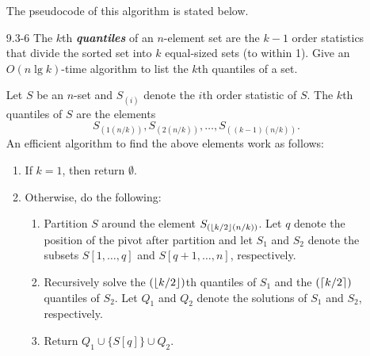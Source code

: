 \begin{enumerate}
\begin{framed}
The pseudocode of this algorithm is stated below.

\begin{algorithm}[H]
\SetAlgoNoEnd\DontPrintSemicolon
\BlankLine
{}
\nonl{}
\end{algorithm}

\end{framed}

\newpage

\item[9.3-6]{The $k$th \textbf{\emph{quantiles}} of an $n$-element set are the
$k - 1$ order statistics that divide the sorted set into $k$ equal-sized sets
(to within 1). Give an $O(n \lg k)$-time algorithm to list the $k$th quantiles
of a set.}

\begin{framed}
Let $S$ be an $n$-set and $S_{(i)}$ denote the $i$th order statistic of $S$. The
$k$th quantiles of $S$ are the elements
\[
  S_{(1 (n / k))}, S_{(2 (n / k))}, \dots, S_{((k - 1) (n / k))}.
\]
An efficient algorithm to find the above elements work as follows:
\begin{enumerate}
\item If $k = 1$, then return $\emptyset$.
\item Otherwise, do the following:
\begin{enumerate}
\item Partition $S$ around the element $S_{(\lfloor k / 2\rfloor (n / k))}$. Let $q$
denote the position of the pivot after partition and let $S_1$ and $S_2$ denote
the subsets $S[1, \dots, q]$ and $S[q + 1, \dots, n]$, respectively.
\item Recursively solve the $(\lfloor k/2\rfloor)$th quantiles of $S_1$ and the
$(\lceil k/2\rceil)$ quantiles of $S_2$. Let $Q_1$ and $Q_2$ denote the solutions of
$S_1$ and $S_2$, respectively.
\item Return $Q_1 \cup \{S[q]\} \cup Q_2$.
\end{enumerate}
\end{enumerate}


\end{framed}
\end{enumerate}
